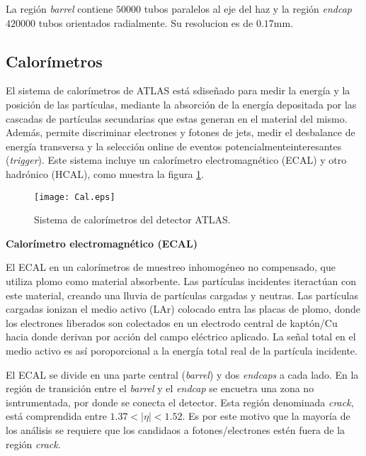 La región \textit{barrel} contiene $50000$ tubos paralelos al eje del haz y la región \textit{endcap} $420000$ tubos orientados radialmente. Su resolucion es de $0.17$mm.

\subsection{Calorímetros}

El sistema de calorímetros de ATLAS está sdiseñado para medir la energía y la posición de las partículas, mediante la absorción de la energía depositada por las cascadas de partículas secundarias que estas generan en el material del mismo. Además, permite discriminar electrones y fotones de jets, medir el desbalance de energía transversa y la selección online de eventos potencialmenteinteresantes (\textit{trigger}). Este sistema incluye un calorímetro electromagnético (ECAL) y otro hadrónico (HCAL), como muestra la figura \ref{Cal}.

\begin{figure}
\centering
\texttt{[image: Cal.eps]}
\caption{Sistema de calorímetros del detector ATLAS.}
\label{Cal}
\end{figure}

{\bf Calorímetro electromagnético (ECAL)}

El ECAL en un calorímetros de muestreo inhomogéneo no compensado, que utiliza plomo como material absorbente. Las partículas incidentes iteractúan con este material, creando una lluvia de partículas cargadas y neutras. Las partículas cargadas ionizan el medio activo (LAr) colocado entra las placas de plomo, donde los electrones liberados son colectados en un electrodo central de kaptón/Cu hacia donde derivan por acción del campo eléctrico aplicado. La señal total en el medio activo es así poroporcional a la energía total real de la partícula incidente.


El ECAL se divide en una parte central (\textit{barrel}) y dos \textit{endcaps} a cada lado. En la región de transición entre el \textit{barrel} y el \textit{endcap} se encuetra una zona no isntrumentada, por donde se conecta el detector. Esta región denominada \textit{crack}, está comprendida entre $1.37 < |\eta| < 1.52$. Es por este motivo que la mayoría de los análisis se requiere que los candidaos a fotones/electrones estén fuera de la región \textit{crack}.

